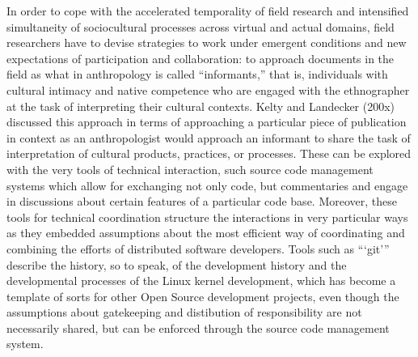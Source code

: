 \documentclass[10pt,letter,oneside]{scrartcl}
\begin{document}

In order to cope with the accelerated temporality of field research and
intensified simultaneity of sociocultural processes across virtual and
actual domains, field researchers have to devise strategies to work
under emergent conditions and new expectations of participation and
collaboration: to approach documents in the field as what in
anthropology is called ``informants,'' that is, individuals with
cultural intimacy and native competence who are engaged with the
ethnographer at the task of interpreting their cultural contexts. Kelty
and Landecker (200x) discussed this approach in terms of approaching a
particular piece of publication in context as an anthropologist would
approach an informant to share the task of interpretation of cultural
products, practices, or processes. These can be explored with the very
tools of technical interaction, such source code management systems which
allow for exchanging not only code, but commentaries and engage in
discussions about certain features of a particular code base. Moreover,
these tools for technical coordination structure the interactions in
very particular ways as they embedded assumptions about the most 
efficient way of coordinating and combining the efforts of distributed
software developers. Tools such as ```git''' describe the history, so
to speak, of the development history and the developmental processes
of the Linux kernel development, which has become a template of sorts
for other Open Source development projects, even though the assumptions
about gatekeeping and distibution of responsibility are not necessarily
shared, but can be enforced through the source code management system.
\end{document}
